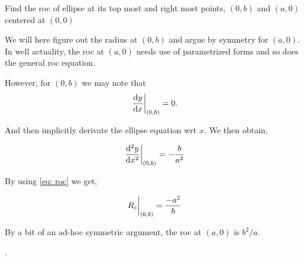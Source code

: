 \begin{example}
    Find the roc of ellipse at its top most and right most points, \((0,b)\) and \((a, 0)\) centered 
    at \((0,0)\)

    \begin{soln}
        We will here figure out the radius at \((0,b)\) and argue by symmetry for \((a,0)\).
        In well actuality, the roc at \((a, 0)\) needs use of parametrized forms and 
        so does the general roc equation.

        However, for \((0,b)\) we may note that \[\eval{\dv{y}{x}}_{(0, b)}=0.\]
        
        And then implicitly derivate the ellipse equation wrt \(x\). We then obtain,
        
        \begin{equation*}
            \eval{\dv[2]{y}{x}}_{(0,b)} = -\frac{b}{a^2} 
        \end{equation*}

        By using \eqref{eq: roc} we get,

        \begin{equation}
            \eval{R_c}_{(0,b)} = \frac{-a^2}{b}
        \end{equation}

        By a bit of an ad-hoc symmetric argument, the roc at \((a, 0)\) is 
        \(b^2/a\).
    \end{soln} 
\end{example}

.

